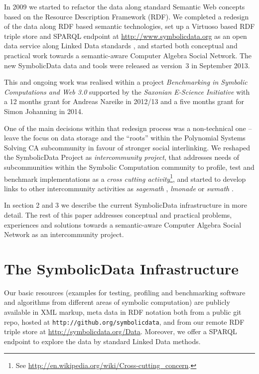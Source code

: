 \documentclass{llncs}
\newcommand{\SD}{{\sc Symbolic\-Data}}
\begin{document}
In 2009 we started to refactor the data along standard Semantic Web concepts
based on the Resource Description Framework (RDF).  We completed a redesign of
the data along RDF based semantic technologies, set up a Virtuoso
\cite{Virtuoso} based RDF triple store and SPARQL endpoint at
\url{http://www.symbolicdata.org} as an open data service along Linked Data
standards \cite{lod}, and started both conceptual and practical work towards a
semantic-aware Computer Algebra Social Network. The new {\SD} data and tools
were released as version~3 in September 2013.

This and ongoing work was realised within a project \emph{Benchmarking in
  Symbolic Computations and Web 3.0} supported by the \emph{Saxonian E-Science
  Initiative} \cite{E-Science-Sachsen} with a 12 months grant for Andreas
Nareike in 2012/13 and a five months grant for Simon Johanning in 2014.

One of the main decisions within that redesign process was a non-technical one
-- leave the focus on data storage and the ``roots'' within the Polynomial
Systems Solving CA subcommunity in favour of stronger social interlinking. We
reshaped the {\SD} Project as \emph{intercommunity project}, that addresses
needs of subcommunities within the Symbolic Computation community to profile,
test and benchmark implementations as a \emph{cross cutting
  activity}\footnote{See
  \url{http://en.wikipedia.org/wiki/Cross-cutting_concern}.}, and started to
develop links to other intercommunity activities as \emph{sagemath}
\cite{Sagemath}, \emph{lmonade} \cite{lmonade} or \emph{swmath} \cite{swmath}.

In section 2 and 3 we describe the current {\SD} infrastructure in more
detail.  The rest of this paper addresses conceptual and practical problems,
experiences and solutions towards a semantic-aware Computer Algebra Social
Network as an intercommunity project.

\section{The {\SD} Infrastructure}

Our basic resources (examples for testing, profiling and benchmarking software
and algorithms from different areas of symbolic computation) are publicly
available in XML markup, meta data in RDF notation both from a public git
repo, hosted at \texttt{http://github.org/symbolicdata}, and from our remote
RDF triple store at \url{http://symbolicdata.org/Data}. Moreover, we offer a
SPARQL endpoint \cite{sdsparql} to explore the data by standard Linked Data
methods.
\end{document}

